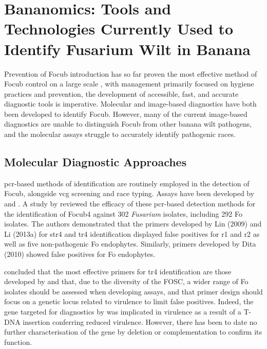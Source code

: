 \section{Bananomics: Tools and Technologies Currently Used to Identify Fusarium Wilt  in Banana}

Prevention of \ac{Focub} introduction has so far proven the most effective method of \ac{Focub} control on a large scale \parencite{Ploetz2015b}, with management primarily focused on hygiene practices and prevention, the development of accessible, fast, and accurate diagnostic tools is imperative. Molecular and image-based diagnostics have both been developed to identify \ac{Focub}. However, many of the current image-based diagnostics are unable to distinguish \ac{Focub} from other banana wilt pathogens, and the molecular assays struggle to accurately identify pathogenic races.  

\subsection{Molecular Diagnostic Approaches}
\Ac{pcr}-based methods of identification are routinely employed in the detection of \ac{Focub}, alongside \ac{vcg} screening and race typing. Assays have been developed by \textcite{Lin2009, Dita2010, Li2013a} and \textcite {Li2013b}. A study by \textcite{Magdama2019} reviewed the efficacy of these \ac{pcr}-based detection methods for the identification of \ac{Focub4} against 302 \textit{Fusarium} isolates, including 292 \ac{Fo} isolates. The authors demonstrated that the primers developed by Lin \et (2009) and Li \et (2013a) for \ac{str4} and \ac{tr4} identification displayed false positives for \ac{r1} and \ac{r2} as well as five non-pathogenic \ac{Fo} endophytes. Similarly, primers developed by Dita \et (2010) showed false positives for \ac{Fo} endophytes. 

\textcite{Magdama2019} concluded that the most effective primers for \ac{tr4} identification are those developed by \textcite {Li2013b} and that, due to the diversity of the \ac{FOSC}, a wider range of \ac{Fo} isolates should be assessed when developing assays, and that primer design should focus on a genetic locus related to virulence to limit false positives.  Indeed, the gene targeted for diagnostics by \textcite {Li2013b} was implicated in virulence as a result of a T-DNA insertion conferring reduced virulence. However, there has been to date no further characterisation of the gene by deletion or complementation to confirm its function.  

